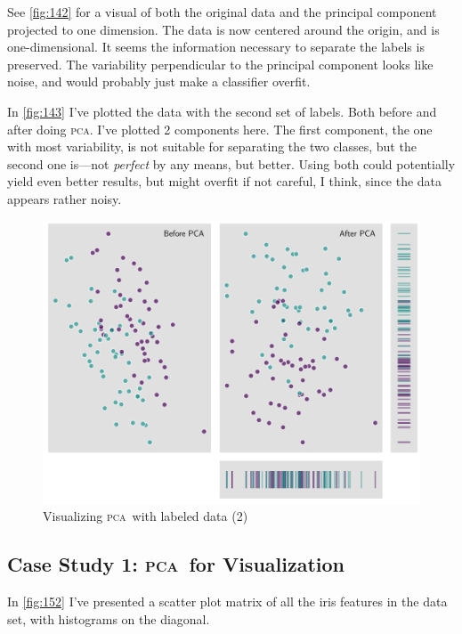 \documentclass[british]{article}
\newcommand{\pca}{\texorpdfstring{\textsc{pca}}{PCA}}
\begin{document}
See \autoref{fig:142} for a visual of both the original data and the
principal component projected to one dimension. The data is now centered
around the origin, and is one-dimensional. It seems the information
necessary to separate the labels is preserved. The variability
perpendicular to the principal component looks like noise, and would
probably just make a classifier overfit.


In \autoref{fig:143} I've plotted the data with the second set of
labels. Both before and after doing \pca. I've plotted 2
components here. The first component, the one with most variability, is
not suitable for separating the two classes, but the second one is---not
\emph{perfect} by any means, but better. Using both could potentially
yield even better results, but might overfit if not careful, I think,
since the data appears rather noisy.

\begin{figure}
  \centering
  \includegraphics[width=0.9\columnwidth]{fig/143.pdf}
  \caption{Visualizing \pca\ with labeled data (2)}
  \label{fig:143}
\end{figure}

\subsection{Case Study 1: \pca\ for Visualization}


In \autoref{fig:152} I've presented a scatter plot matrix of all the
iris features in the data set, with histograms on the diagonal.
\end{document}
